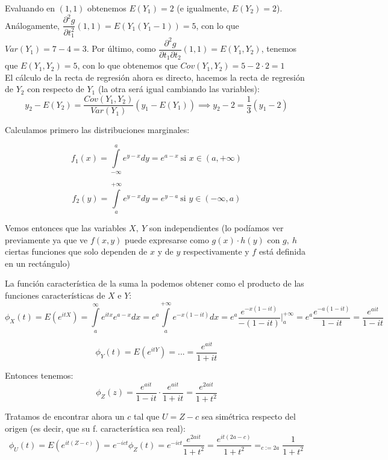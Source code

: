 \documentclass[openany]{book}
\begin{document}
\begin{exercise}
Evaluando en $ (1,1) $ obtenemos $ E(Y_1) = 2 $ (e igualmente, $ E(Y_2)=2 $). Análogamente, $ \dfrac{\partial ^2 g}{\partial t_1^2}(1,1) = E(Y_1(Y_1-1)) = 5 $, con lo que $ Var(Y_1) = 7-4=3 $. Por último, como $ \dfrac{\partial ^2 g}{\partial t_1 \partial t_2}(1,1) = E(Y_1,Y_2) $, tenemos que $ E(Y_1,Y_2) = 5 $, con lo que obtenemos que $ Cov(Y_1,Y_2) = 5-2\cdot 2 = 1 $\\

El cálculo de la recta de regresión ahora es directo, hacemos la recta de regresión de $ Y_2 $ con respecto de $ Y_1 $ (la otra será igual cambiando las variables):
$$ y_2-E(Y_2) = \dfrac{Cov(Y_1,Y_2)}{Var(Y_1)}(y_1-E(Y_1)) \implies y_2 -2 = \dfrac{1}{3}(y_1-2) $$


\end{exercise}

\begin{exercise}
    Calculamos primero las distribuciones marginales:

     $$ f_{1}(x) = \int\limits_{-\infty}^{a} e^{y-x}dy = e^{a-x}\ \text{si } x \in  (a,+\infty) $$


     $$ f_{2}(y) = \int\limits_{a}^{+\infty} e^{y-x}dy = e^{y-a}\ \text{si } y \in  (-\infty,a) $$

    Vemos entonces que las variables $ X,\ Y $ son independientes (lo podíamos ver previamente ya que ve $ f(x,y) $ puede expresarse como $ g(x)\cdot h(y) $ con $ g,\ h $ ciertas funciones que solo dependen de $ x $ y de $ y $ respectivamente y $ f $ está definida en un rectángulo) 

    La función característica de la suma la podemos obtener como el producto de las funciones características de $ X $ e $ Y $:
    $$ \phi_{X}(t) = E(e^{itX}) = \int\limits_{a }^{\infty} e^{itx}e^{a-x}dx = e^{a} \int\limits_{a}^{+\infty}e^{-x(1-it)}dx = e^{a} \dfrac{e^{-x(1-it)}}{-(1-it)} \Biggr|_{a}^{+\infty} = e^{a} \dfrac{e^{-a(1-it)}}{1-it} = \dfrac{e^{ait}}{1-it}$$

    $$ \phi_{Y}(t) = E(e^{itY}) = ... = \dfrac{e^{ait}}{1+it}$$

    Entonces tenemos:
    $$ \phi_{Z}(z) = \dfrac{e^{ait}}{1-it} \cdot \dfrac{e^{ait}}{1+it} = \dfrac{e^{2ait}}{1+t^2} $$

    Tratamos de encontrar ahora un $ c $ tal que $ U=Z-c $ sea simétrica respecto del origen (es decir, que su f. característica sea real):
    $$ \phi_{U}(t) = E(e^{it(Z-c)}) = e^{-ict}\phi_{Z}(t) = e^{-ict}\dfrac{e^{2ait}}{1+t^2} = \dfrac{e^{it(2a-c)}}{1+t^2} =_{c:= 2a} \dfrac{1}{1+t^2} $$


\end{exercise}
\end{document}
